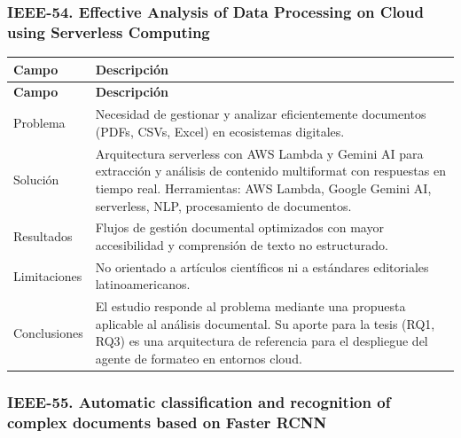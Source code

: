 \subsubsection*{IEEE-54. Effective Analysis of Data Processing on Cloud using Serverless Computing}

\begin{longtable}{@{}>{\raggedright\arraybackslash}p{}>{\raggedright\arraybackslash}p{}@{}}
\toprule
\textbf{Campo} & \textbf{Descripción} \\
\midrule
\endfirsthead
\toprule
\textbf{Campo} & \textbf{Descripción} \\
\midrule
\endhead
\bottomrule
\endfoot
\endlastfoot
Problema & Necesidad de gestionar y analizar eficientemente documentos (PDFs, CSVs, Excel) en ecosistemas digitales. \\
Solución & Arquitectura serverless con AWS Lambda y Gemini AI para extracción y análisis de contenido multiformat con respuestas en tiempo real. Herramientas: AWS Lambda, Google Gemini AI, serverless, NLP, procesamiento de documentos. \\
Resultados & Flujos de gestión documental optimizados con mayor accesibilidad y comprensión de texto no estructurado. \\
Limitaciones & No orientado a artículos científicos ni a estándares editoriales latinoamericanos. \\
Conclusiones & El estudio responde al problema mediante una propuesta aplicable al análisis documental. Su aporte para la tesis (RQ1, RQ3) es una arquitectura de referencia para el despliegue del agente de formateo en entornos cloud. \\
\end{longtable}

\subsubsection*{IEEE-55. Automatic classification and recognition of complex documents based on Faster RCNN}

